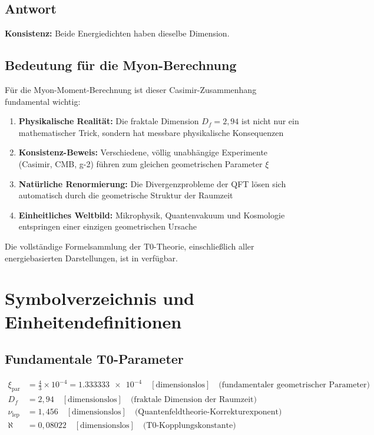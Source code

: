 \documentclass[12pt,a4paper]{article}
\theoremstyle{remark}
\newenvironment{answer}{\subsection*{Antwort}}{\vspace{1em}}
\begin{document}
\begin{answer}
\begin{units}
		\textbf{Konsistenz:} Beide Energiedichten haben dieselbe Dimension.
	\end{units}
	
	\subsection{Bedeutung für die Myon-Berechnung}
	
	Für die Myon-Moment-Berechnung ist dieser Casimir-Zusammenhang fundamental wichtig:
	
	\begin{enumerate}
		\item \textbf{Physikalische Realität:} Die fraktale Dimension $D_f = 2{,}94$ ist nicht nur ein mathematischer Trick, sondern hat messbare physikalische Konsequenzen
		\item \textbf{Konsistenz-Beweis:} Verschiedene, völlig unabhängige Experimente (Casimir, CMB, g-2) führen zum gleichen geometrischen Parameter $\xi$
		\item \textbf{Natürliche Renormierung:} Die Divergenzprobleme der QFT lösen sich automatisch durch die geometrische Struktur der Raumzeit
		\item \textbf{Einheitliches Weltbild:} Mikrophysik, Quantenvakuum und Kosmologie entspringen einer einzigen geometrischen Ursache
	\end{enumerate}
	
	\begin{important}[title=Mathematische Formeln]
		Die vollständige Formelsammlung der T0-Theorie, einschließlich aller energiebasierten Darstellungen, ist in \cite{pascher_formeln_energiebasiert_2025} verfügbar.
	\end{important}
\end{answer}
	\section{Symbolverzeichnis und Einheitendefinitionen}
	
	\subsection{Fundamentale T0-Parameter}
	\begin{align}
		\xi_{\text{par}} &= \frac{4}{3} \times 10^{-4} = \num{1.333333e-4} \quad [\text{dimensionslos}] \quad \text{(fundamentaler geometrischer Parameter)} \\
		D_f &= 2,94 \quad [\text{dimensionslos}] \quad \text{(fraktale Dimension der Raumzeit)} \\
		\nu_{\text{lep}} &= 1,456 \quad [\text{dimensionslos}] \quad \text{(Quantenfeldtheorie-Korrekturexponent)} \\
		\aleph &= 0,08022 \quad [\text{dimensionslos}] \quad \text{(T0-Kopplungskonstante)}
	\end{align}
	
\end{document}

